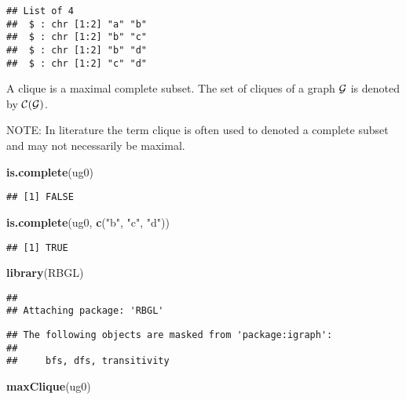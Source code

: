 \documentclass[]{article}
\newenvironment{Shaded}{\begin{snugshade}}{\end{snugshade}}
\newcommand{\KeywordTok}[1]{\textcolor[rgb]{0.13,0.29,0.53}{\textbf{#1}}}
\newcommand{\StringTok}[1]{\textcolor[rgb]{0.31,0.60,0.02}{#1}}
\newcommand{\NormalTok}[1]{#1}
\begin{document}
\begin{verbatim}
## List of 4
##  $ : chr [1:2] "a" "b"
##  $ : chr [1:2] "b" "c"
##  $ : chr [1:2] "b" "d"
##  $ : chr [1:2] "c" "d"
\end{verbatim}

A clique is a maximal complete subset. The set of cliques of a graph
\(\cal G\) is denoted by \(\cal C(G)\).

NOTE: In literature the term clique is often used to denoted a complete
subset and may not necessarily be maximal.

\begin{Shaded}
\begin{Highlighting}[]
\KeywordTok{is.complete}\NormalTok{(ug0)}
\end{Highlighting}
\end{Shaded}

\begin{verbatim}
## [1] FALSE
\end{verbatim}

\begin{Shaded}
\begin{Highlighting}[]
\KeywordTok{is.complete}\NormalTok{(ug0, }\KeywordTok{c}\NormalTok{(}\StringTok{"b"}\NormalTok{, }\StringTok{"c"}\NormalTok{, }\StringTok{"d"}\NormalTok{))}
\end{Highlighting}
\end{Shaded}

\begin{verbatim}
## [1] TRUE
\end{verbatim}

\begin{Shaded}
\begin{Highlighting}[]
\KeywordTok{library}\NormalTok{(RBGL)}
\end{Highlighting}
\end{Shaded}

\begin{verbatim}
## 
## Attaching package: 'RBGL'
\end{verbatim}

\begin{verbatim}
## The following objects are masked from 'package:igraph':
## 
##     bfs, dfs, transitivity
\end{verbatim}

\begin{Shaded}
\begin{Highlighting}[]
\KeywordTok{maxClique}\NormalTok{(ug0)}
\end{Highlighting}
\end{Shaded}
\end{document}
